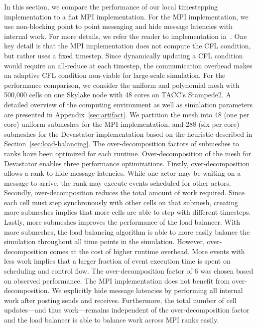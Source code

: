 In this section, we compare the performance of our local timestepping implementation to a flat MPI implementation. For the MPI implementation, we use non-blocking point to point messaging and hide message latencies with internal work. For more details, we refer the reader to implementation in~\cite{Bremer2019}. One key detail is that the MPI implementation does not compute the CFL condition, but rather uses a fixed timestep. Since dynamically updating a CFL condition would require an all-reduce at each timestep, the communication overhead makes an adaptive CFL condition non-viable for large-scale simulation. For the performance comparison, we consider the uniform and polynomial mesh with 500,000 cells on one Skylake node with 48 cores on TACC's Stampede2. A detailed overview of the computing environment as well as simulation parameters are presented in Appendix~\ref{sec:artifact}. We partition the mesh into 48 (one per core) uniform submeshes for the MPI implementation, and 288 (six per core) submeshes for the Devastator implementation based on the heuristic described in Section~\ref{sec:load-balancing}. %
The over-decomposition factors of submeshes to ranks have been optimized for each runtime.
Over-decomposition of the mesh for Devastator enables three performance optimizations.
Firstly, over-decomposition allows a rank to hide message latencies. While one actor may be waiting on a message to arrive, the rank may execute events scheduled for other actors. 
Secondly, over-decomposition reduces the total amount of work required. Since each cell must step synchronously with other cells on that submesh, creating more submeshes implies that more cells are able to step with different timesteps. 
Lastly, more submeshes improves the performance of the load balancer. With more submeshes, the load balancing algorithm is able to more easily balance the simulation throughout all time points in the simulation. However, over-decomposition  comes at the cost of higher runtime overhead. More events with less work implies that a larger fraction of event execution time is spent on scheduling and control flow. The over-decomposition factor of 6 was chosen based on observed performance.
The MPI implementation does not benefit from over-decomposition. We explicitly hide message latencies by performing all internal work after posting sends and receives. Furthermore, the total number of cell updates---and thus work---remains independent of the over-decomposition factor and the load balancer is able to balance work across MPI ranks easily. 

